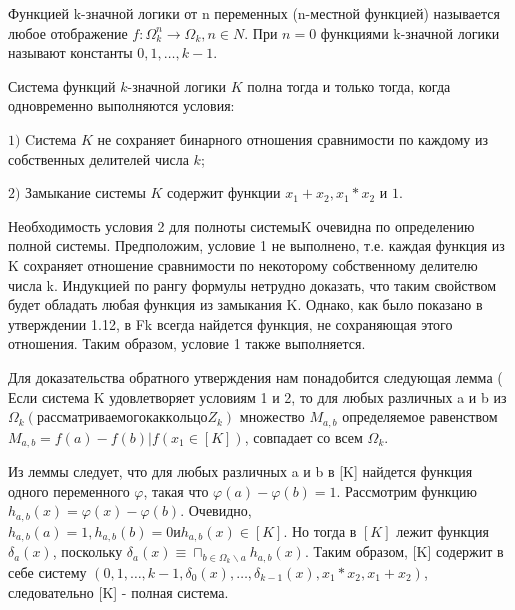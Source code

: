 \begin{defs}
Функцией k-значной логики от n переменных (n-местной функцией) называется любое отображение $f : \Omega_{k}^{n} \rightarrow  \Omega_{k}, n \in N $. При $n =0$ функциями k-значной логики называют константы $0,1,\ldots, k-1 $.
\end{defs}

\begin{proofs}[А. А. Нечаев]
Система функций $k$-значной логики $K$ полна тогда и только тогда, когда одновременно выполняются условия:

$1)$  Cистема $K$ не сохраняет бинарного отношения сравнимости по каждому из собственных делителей числа $k$;

$2)$ Замыкание системы $K$ содержит функции $x_{1} + x_{2}, x_{1}  * x_{2}$ и $1$.
	\begin{dokvo}
		 Необходимость условия 2 для полноты системыK очевидна по определению полной системы. Предположим, условие 1 не выполнено, т.е. каждая функция из K сохраняет отношение сравнимости по некоторому собственному делителю числа k. Индукцией по рангу формулы нетрудно доказать, что таким свойством будет обладать любая функция из замыкания K. Однако, как было показано в утверждении 1.12, в Fk всегда найдется функция, не сохраняющая этого отношения. Таким образом, условие 1 также выполняется.

		Для доказательства обратного утверждения нам понадобится следующая лемма ( Если система K удовлетворяет условиям 1 и 2, то для любых различных a и b из $\Omega_{k}  (рассматриваемого как кольцо Z_{k})$  множество $M_{a,b}$ определяемое равенством $ M_{a,b} = { f(a) - f(b) | f(x_{1} \in [K])}$, совпадает со всем $\Omega_{k}$.

		Из леммы следует, что для любых различных a и b в [K] найдется функция одного переменного $\varphi$, такая что $\varphi(a) - \varphi (b) = 1$.  Рассмотрим функцию $h_{a,b}(x) = \varphi(x) - \varphi(b)$. Очевидно, $h_{a,b}(a) = 1, h_{a,b}(b) = 0 и h_{a,b}(x) \in [K]$.  Но тогда в $[K]$ лежит функция $\delta_{a}(x)$,   поскольку $\delta_{a}(x) \equiv \sqcap_{b \in \Omega_{k} \backslash {a}} h_{a,b}(x)$. Таким образом, [K] содержит в себе систему $({0, 1, \ldots , k-1, \delta_{0}(x), \ldots , \delta_{k-1}(x), x_{1}*x_{2}, x_{1}+x_{2}})$, следовательно [K] - полная система.
	\end{dokvo}
\end{proofs}

